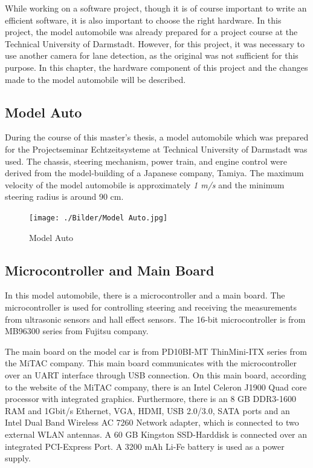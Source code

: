 While working on a software project, though it is of course important to write an efficient software, it is also important to choose the right hardware. In this project, the model automobile was already prepared for a project course at the Technical University of Darmstadt. However, for this project, it was necessary to use another camera for lane detection, as the original was not sufficient for this purpose. In this chapter, the hardware component of this project and the changes made to the model automobile will be described.


%
\subsection{Model Auto}\label{sec:Model Auto}


During the course of this master's thesis, a model automobile which was prepared for the Projectseminar Echtzeitsysteme at Technical University of Darmstadt was used. The chassis, steering mechanism, power train, and engine control were derived from the model-building of a Japanese company, Tamiya. The maximum velocity of the model automobile is approximately \emph{\color{green}1 m/s} and the minimum steering radius is around 90 cm. 

\begin{figure}[H]
	\centering
	\hspace*{0cm}   
	\texttt{[image: ./Bilder/Model Auto.jpg]}
	\caption{Model Auto}
\end{figure}

%
\subsection{Microcontroller and Main Board}\label{sec:Microcontroller and Main Board}


In this model automobile, there is a microcontroller and a main board. The microcontroller is used for controlling steering 
and receiving the measurements from ultrasonic sensors and hall effect sensors. The 16-bit microcontroller is from 
MB96300 series from Fujitsu company.

The main board on the model car is from PD10BI-MT ThinMini-ITX series from the MiTAC company. This main board communicates 
with the microcontroller over an UART interface through USB connection. On this main board, according to the website of the MiTAC company\cite{PD10BIMT}, there is an Intel Celeron J1900 Quad core processor with integrated graphics. Furthermore, there is an 8 GB DDR3-1600 RAM and 1Gbit/s Ethernet, VGA, HDMI, USB 2.0/3.0, SATA ports and an Intel Dual Band Wireless AC 7260 Network adapter, which is connected to two external WLAN antennas. A 60 GB Kingston SSD-Harddisk is connected over an integrated PCI-Express Port. A 3200 mAh Li-Fe battery is used as a power supply.
%

